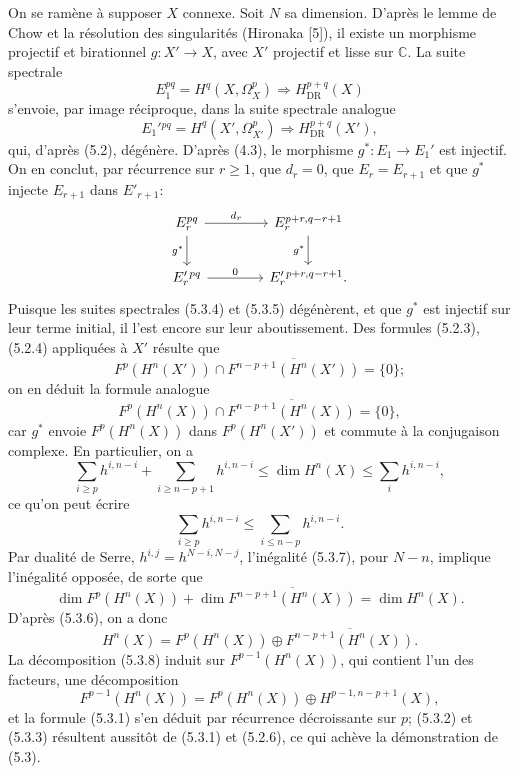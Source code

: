 \documentclass[10pt]{article}
\providecommand{\C}{\mathbb C}
\providecommand{\DR}{\operatorname{DR}}
\begin{document}
On se ramène à supposer $X$ connexe. Soit $N$ sa dimension. D'après le lemme de Chow et la résolution des singularités (Hironaka [5]), il existe un morphisme projectif et birationnel $g:X'\to X$, avec $X'$ projectif et lisse sur $\C$. La suite spectrale
\[
\tag{5.3.4}
E_1^{pq}=H^q(X,\Omega_X^p)\Longrightarrow H_{\DR}^{p+q}(X)
\]
s'envoie, par image réciproque, dans la suite spectrale analogue
\[
\tag{5.3.5}
E_1'{}^{pq}=H^q(X',\Omega_{X'}^p)\Longrightarrow H_{\DR}^{p+q}(X'),
\]
qui, d'après (5.2), dégénère. D'après (4.3), le morphisme $g^*:E_1\to E_1'$ est injectif. On en conclut, par récurrence sur $r\ge1$, que $d_r=0$, que $E_r=E_{r+1}$ et que $g^*$ injecte $E_{r+1}$ dans $E'_{r+1}$:
\[
\begin{tikzcd}[column sep=4.0em,row sep=2.1em]
E_r^{pq} \arrow[r,"d_r"] \arrow[d,"g^*"'] & E_r^{p+r,q-r+1} \arrow[d,"g^*"']\\
E_r'{}^{pq} \arrow[r,"0"] & E_r'{}^{p+r,q-r+1} .
\end{tikzcd}
\]
Puisque les suites spectrales (5.3.4) et (5.3.5) dégénèrent, et que $g^*$ est injectif sur leur terme initial, il l'est encore sur leur aboutissement. Des formules (5.2.3), (5.2.4) appliquées à $X'$ résulte que
\[
F^p(H^n(X'))\cap\overline{F^{n-p+1}(H^n(X'))}=\{0\};
\]
on en déduit la formule analogue
\[
\tag{5.3.6}
F^p(H^n(X))\cap\overline{F^{n-p+1}(H^n(X))}=\{0\},
\]
car $g^*$ envoie $F^p(H^n(X))$ dans $F^p(H^n(X'))$ et commute à la conjugaison complexe. En particulier, on a
\[
\sum_{i\ge p}h^{i,n-i}+\sum_{i\ge n-p+1}h^{i,n-i}\le \dim H^n(X)\le \sum_i h^{i,n-i},
\]
ce qu'on peut écrire
\[
\tag{5.3.7}
\sum_{i\ge p}h^{i,n-i}\le\sum_{i\le n-p}h^{i,n-i}.
\]
Par dualité de Serre, $h^{i,j}=h^{N-i,N-j}$, l'inégalité (5.3.7), pour $N-n$, implique l'inégalité opposée, de sorte que
\[
\dim F^p(H^n(X))+\dim \overline{F^{n-p+1}(H^n(X))}=\dim H^n(X).
\]
D'après (5.3.6), on a donc
\[
\tag{5.3.8}
H^n(X)=F^p(H^n(X))\oplus\overline{F^{n-p+1}(H^n(X))}.
\]
La décomposition (5.3.8) induit sur $F^{p-1}(H^n(X))$, qui contient l'un des facteurs, une décomposition
\[
F^{p-1}(H^n(X))=F^p(H^n(X))\oplus H^{p-1,n-p+1}(X),
\]
et la formule (5.3.1) s'en déduit par récurrence décroissante sur $p$; (5.3.2) et (5.3.3) résultent aussitôt de (5.3.1) et (5.2.6), ce qui achève la démonstration de (5.3).
\end{document}
